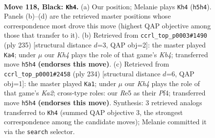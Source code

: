 \documentclass[11pt]{article}
\begin{document}
\begin{figure}[p]\centering
\begin{subfigure}{0.46\textwidth}\centering
\resizebox{\linewidth}{!}{%
\newchessgame
\chessboard[
  setfen={8/7K/8/4r2k/8/8/8/8 b - - 21 118},
  showmover=false,
  pgfstyle=straightmove, color=movearrow, markmove={h5-h4}
]}
\caption{}
\end{subfigure}\hfill
\begin{subfigure}{0.46\textwidth}\centering
\resizebox{\linewidth}{!}{%
\newchessgame
\chessboard[
  setfen={8/1r6/3K4/1k6/8/4Q3/8/8 b - - 12 118},
  showmover=false,
  pgfstyle=straightmove, color=movearrow, markmove={b5-a4}
]}
\caption{}
\end{subfigure}
\\[4pt]
\begin{subfigure}{0.46\textwidth}\centering
\resizebox{\linewidth}{!}{%
\newchessgame
\chessboard[
  setfen={8/8/8/8/1k3P2/8/K7/8 w - - 6 118},
  showmover=false,
  pgfstyle=straightmove, color=movearrow, markmove={a2-a1}
]}
\caption{}
\end{subfigure}\hfill

\caption{\textbf{Move 118, Black: \texttt{Kh4}.} (a) Our position; Melanie plays \texttt{Kh4} (\texttt{h5h4}). Panels (b)--(d) are the retrieved master positions whose correspondence most drove this move (highest QAP objective among those that transfer to it). (b) Retrieved from \texttt{ccrl\_top\_p0003\#1490} (ply 235) [structural distance $d$=3, QAP obj=2]: the master played \texttt{Ka4}; under $\mu$ our \emph{Kh4} plays the role of that game's \emph{Kb4}; transferred move \texttt{h5h4} \textbf{(endorses this move)}. (c) Retrieved from \texttt{ccrl\_top\_p0001\#2458} (ply 234) [structural distance $d$=6, QAP obj=1]: the master played \texttt{Ka1}; under $\mu$ our \emph{Kh4} plays the role of that game's \emph{Ka2}; cross-type roles: our \emph{R}e5 as their \emph{P}f4; transferred move \texttt{h5h4} \textbf{(endorses this move)}. Synthesis: 3 retrieved analogs transferred to \texttt{Kh4} (summed QAP objective 3, the strongest correspondence among the candidate moves); Melanie committed it via the \texttt{search} selector.}
\label{fig:thought-m235}
\end{figure}

\clearpage
\end{document}

